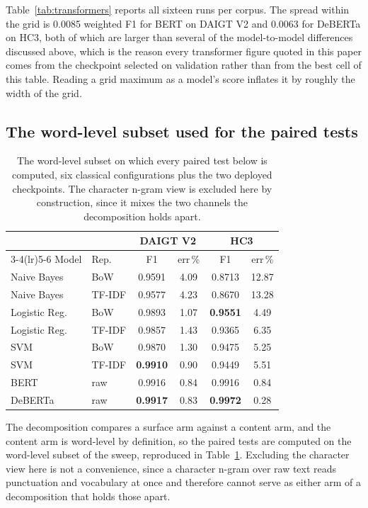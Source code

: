 \documentclass[conference,a4paper]{IEEEtran}
\begin{document}
Table~\ref{tab:transformers} reports all sixteen runs per corpus. The spread within the grid is 0.0085 weighted F1 for BERT on DAIGT V2 and 0.0063 for DeBERTa on HC3, both of which are larger than several of the model-to-model differences discussed above, which is the reason every transformer figure quoted in this paper comes from the checkpoint selected on validation rather than from the best cell of this table. Reading a grid maximum as a model's score inflates it by roughly the width of the grid.

\subsection{The word-level subset used for the paired tests}

\begin{table}[!ht]
\centering
\caption{The word-level subset on which every paired test below is computed, six classical configurations plus the two deployed checkpoints. The character n-gram view is excluded here by construction, since it mixes the two channels the decomposition holds apart.}
\label{tab:allmodels}
\footnotesize
\setlength{\tabcolsep}{3.5pt}
\begin{tabular}{@{}llcccc@{}}
\toprule
& & \multicolumn{2}{c}{DAIGT V2} & \multicolumn{2}{c}{HC3} \\
\cmidrule(lr){3-4}\cmidrule(lr){5-6}
Model & Rep. & F1 & err\,\% & F1 & err\,\% \\
\midrule
Naive Bayes & BoW & 0.9591 & 4.09 & 0.8713 & 12.87 \\
Naive Bayes & TF-IDF & 0.9577 & 4.23 & 0.8670 & 13.28 \\
Logistic Reg. & BoW & 0.9893 & 1.07 & \textbf{0.9551} & 4.49 \\
Logistic Reg. & TF-IDF & 0.9857 & 1.43 & 0.9365 & 6.35 \\
SVM & BoW & 0.9870 & 1.30 & 0.9475 & 5.25 \\
SVM & TF-IDF & \textbf{0.9910} & 0.90 & 0.9449 & 5.51 \\
BERT & raw & 0.9916 & 0.84 & 0.9916 & 0.84 \\
DeBERTa & raw & \textbf{0.9917} & 0.83 & \textbf{0.9972} & 0.28 \\
\bottomrule
\end{tabular}
\end{table}

The decomposition compares a surface arm against a content arm, and the content arm is word-level by definition, so the paired tests are computed on the word-level subset of the sweep, reproduced in Table~\ref{tab:allmodels}. Excluding the character view here is not a convenience, since a character n-gram over raw text reads punctuation and vocabulary at once and therefore cannot serve as either arm of a decomposition that holds those apart.
\end{document}
